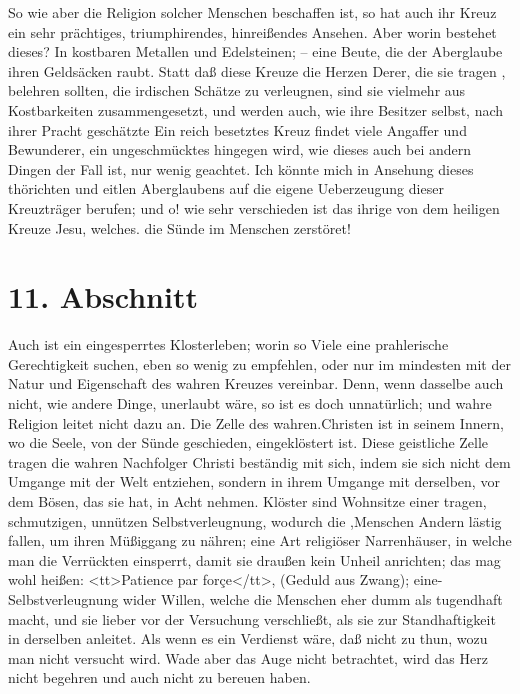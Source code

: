 So wie aber die Religion solcher Menschen beschaffen ist, so hat auch ihr Kreuz
ein sehr prächtiges, triumphirendes, hinreißendes Ansehen. Aber worin bestehet
dieses? In kostbaren Metallen und Edelsteinen; -- eine Beute, die der Aberglaube
ihren Geldsäcken raubt. Statt daß diese Kreuze die Herzen Derer, die sie tragen
, belehren sollten, die irdischen Schätze zu verleugnen, sind sie vielmehr aus
Kostbarkeiten zusammengesetzt, und werden auch, wie ihre Besitzer selbst, nach
ihrer Pracht geschätzte Ein reich besetztes Kreuz findet viele Angaffer und
Bewunderer, ein ungeschmücktes hingegen wird, wie dieses auch bei andern Dingen
der Fall ist, nur wenig geachtet. Ich könnte mich in Ansehung dieses thörichten
und eitlen Aberglaubens auf die eigene Ueberzeugung dieser Kreuzträger berufen;
und o! wie sehr verschieden ist das ihrige von dem heiligen Kreuze Jesu,
welches. die Sünde im Menschen zerstöret!

\section{11. Abschnitt} \label{kap5_ab11}

Auch ist ein eingesperrtes Klosterleben; worin so Viele eine prahlerische
Gerechtigkeit suchen, eben so wenig zu empfehlen, oder nur im mindesten mit der
Natur und Eigenschaft des wahren Kreuzes vereinbar. Denn, wenn dasselbe auch
nicht, wie andere Dinge, unerlaubt wäre, so ist es doch unnatürlich; und wahre
Religion leitet nicht dazu an. Die Zelle des wahren.Christen ist in seinem
Innern, wo die Seele, von der Sünde geschieden, eingeklöstert ist. Diese
geistliche Zelle tragen die wahren Nachfolger Christi beständig mit sich, indem
sie sich nicht dem Umgange mit der Welt entziehen, sondern in ihrem Umgange mit
derselben, vor dem Bösen, das sie hat, in Acht nehmen. Klöster sind Wohnsitze
einer tragen, schmutzigen, unnützen Selbstverleugnung, wodurch die ,Menschen
Andern lästig fallen, um ihren Müßiggang zu nähren; eine Art religiöser
Narrenhäuser, in welche man die Verrückten einsperrt, damit sie draußen kein
Unheil anrichten; das mag wohl heißen: <tt>Patience par forçe</tt>, (Geduld aus
Zwang); eine- Selbstverleugnung wider  Willen, welche die Menschen eher dumm als
tugendhaft macht, und sie lieber vor der Versuchung verschließt, als sie zur
Standhaftigkeit in derselben anleitet. Als wenn es ein Verdienst wäre, daß nicht
zu thun, wozu man nicht versucht wird. Wade aber das Auge nicht betrachtet, wird
das Herz nicht begehren und auch nicht zu bereuen haben.

